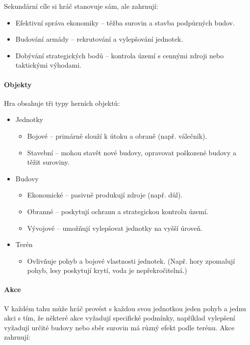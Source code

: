 Sekundární cíle si hráč stanovuje sám, ale zahrnují:

\begin{itemize}
    \item Efektivní správa ekonomiky -- těžba surovin a stavba podpůrných budov.
    \item Budování armády -- rekrutování a vylepšování jednotek.
    \item Dobývání strategických bodů -- kontrola území s cennými zdroji nebo taktickými výhodami.
\end{itemize}

\paragraph{Objekty} Hra obsahuje tři typy herních objektů:

\begin{itemize}
    \item Jednotky
    \begin{itemize}
        \item Bojové -- primárně slouží k útoku a obraně (např. válečník).
        \item Stavební -- mohou stavět nové budovy, opravovat poškozené budovy a těžit suroviny.
    \end{itemize}
    
    \item Budovy
    \begin{itemize}
        \item Ekonomické -- pasivně produkují zdroje (např. důl).
        \item Obranné -- poskytují ochranu a strategickou kontrolu území.
        \item Vývojové -- umožňují vylepšovat jednotky na vyšší úroveň.
    \end{itemize}
    
    \item Terén
    \begin{itemize}
        \item Ovlivňuje pohyb a bojové vlastnosti jednotek. (Např. hory zpomalují pohyb, lesy poskytují krytí, voda je nepřekročitelná.)
    \end{itemize}
    
\end{itemize}

\paragraph{Akce} V každém tahu může hráč provést s každou svou jednotkou jeden pohyb a jednu akci s tím, že některé akce vyžadují specifické podmínky, například vylepšení vyžadují určité budovy nebo sběr surovin má různý efekt podle terénu. Akce zahrnují:

